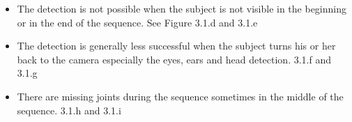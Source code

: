\begin{itemize}
    \item The detection is not possible when the subject is not visible in the beginning or in the end of the sequence. See Figure 3.1.d and 3.1.e
    \item The detection is generally less successful  when the subject turns his or her back to the camera especially the eyes, ears and head detection. 3.1.f and 3.1.g
    \item There are missing joints during the sequence sometimes in the middle of the sequence. 3.1.h and 3.1.i
\end{itemize}
